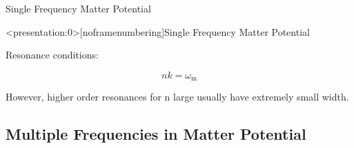 \begin{frame}{Single Frequency Matter Potential}






\end{frame}



\begin{frame}<presentation:0>[noframenumbering]{Single Frequency Matter Potential}

Resonance conditions:

\begin{equation*}
    nk=\omega_{\mathrm m}
\end{equation*}

However, higher order resonances for n large usually have extremely small width.



\end{frame}



\subsection{Multiple Frequencies in Matter Potential}




